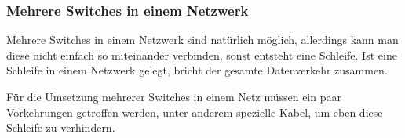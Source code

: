 \subsubsection{Mehrere Switches in einem Netzwerk}
Mehrere Switches in einem Netzwerk sind natürlich möglich, allerdings kann man diese nicht einfach so miteinander verbinden, sonst entsteht eine Schleife.
Ist eine Schleife in einem Netzwerk gelegt, bricht der gesamte Datenverkehr zusammen.

Für die Umsetzung mehrerer Switches in einem Netz müssen ein paar Vorkehrungen getroffen werden, unter anderem spezielle Kabel, um eben diese Schleife zu verhindern.



